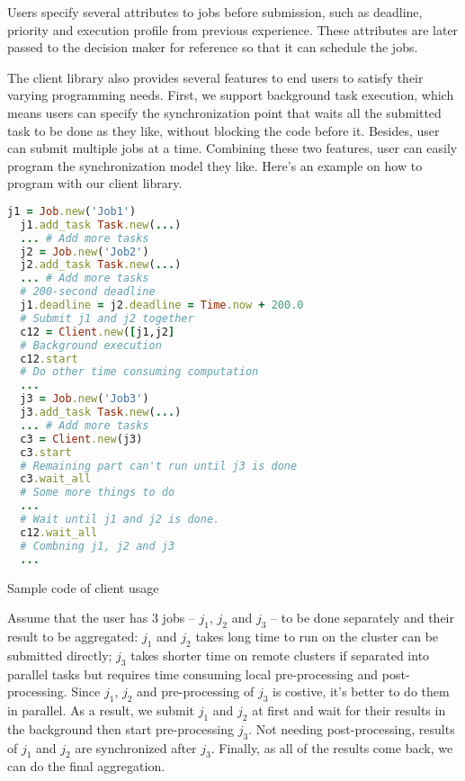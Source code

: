 Users specify several attributes to jobs before submission, such as
deadline, priority and execution profile from previous experience.
These attributes are later passed to the decision maker for reference so
that it can schedule the jobs.

The client library also provides several features to end users to
satisfy their varying programming needs.  First, we support background
task execution, which means users can specify the synchronization point
that waits all the submitted task to be done as they like, without
blocking the code before it.  Besides, user can submit multiple jobs at
a time.  Combining these two features, user can easily program the
synchronization model they like.  Here's an example on how to program
with our client library.

\begin{Example Code}

  \begin{lstlisting}[language=Ruby]
  j1 = Job.new('Job1')
  j1.add_task Task.new(...)
  ... # Add more tasks
  j2 = Job.new('Job2')
  j2.add_task Task.new(...)
  ... # Add more tasks
  # 200-second deadline
  j1.deadline = j2.deadline = Time.now + 200.0
  # Submit j1 and j2 together
  c12 = Client.new([j1,j2]
  # Background execution
  c12.start
  # Do other time consuming computation
  ...
  j3 = Job.new('Job3')
  j3.add_task Task.new(...)
  ... # Add more tasks
  c3 = Client.new(j3)
  c3.start
  # Remaining part can't run until j3 is done
  c3.wait_all
  # Some more things to do
  ...
  # Wait until j1 and j2 is done.
  c12.wait_all
  # Combning j1, j2 and j3
  ...

  \end{lstlisting}
  \caption{Sample code of client usage}
\end{Example Code}

Assume that the user has 3 jobs -- $j_1$, $j_2$ and $j_3$ -- to be done
separately and their result to be aggregated:  $j_1$ and $j_2$ takes
long time to run on the cluster can be submitted directly; $j_3$ takes
shorter time on remote clusters if separated into parallel tasks but
requires time consuming local pre-processing and post-processing.  Since
$j_1$, $j_2$ and pre-processing of $j_3$ is costive, it's better to do
them in parallel.  As a result, we submit $j_1$ and $j_2$ at first and
wait for their results in the background then start pre-processing
$j_3$. Not needing post-processing, results of $j_1$ and $j_2$ are
synchronized after $j_3$.  Finally, as all of the results come back, we
can do the final aggregation.

